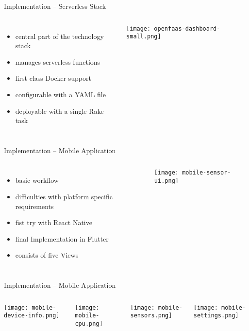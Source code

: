 \begin{frame}{Implementation -- Serverless Stack}
  \begin{columns}
      \begin{itemize}
        \item central part of the technology stack
        \item manages serverless functions
        \item first class Docker support
        \item configurable with a YAML file
        \item deployable with a single Rake task
      \end{itemize}
      \vfill
      \vspace*{1em}
      \centering
      \texttt{[image: openfaas-dashboard-small.png]}
   \end{columns}
\end{frame}




\begin{frame}{Implementation -- Mobile Application}
  \begin{columns}
      \begin{itemize}
        \item basic workflow
        \item difficulties with platform specific requirements
        \item fist try with React Native
        \item final Implementation in Flutter
        \item consists of five Views
      \end{itemize}
      \vfill
      \vspace*{2em}
      \centering
      \texttt{[image: mobile-sensor-ui.png]}
   \end{columns}
\end{frame}

\begin{frame}{Implementation -- Mobile Application}
  \begin{columns}
    \vfill
    \vspace*{2em}
    \centering
    \texttt{[image: mobile-device-info.png]}

    \vfill
    \vspace*{2em}
    \centering
    \texttt{[image: mobile-cpu.png]}

    \vfill
    \vspace*{2em}
    \centering
    \texttt{[image: mobile-sensors.png]}

    \vfill
    \vspace*{2em}
    \centering
    \texttt{[image: mobile-settings.png]}
  \end{columns}
\end{frame}

